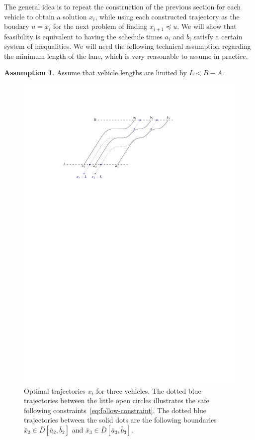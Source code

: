 \documentclass[a4paper]{report}
\theoremstyle{definition}
\newtheorem{assump}{Assumption}[chapter]
\theoremstyle{plain}
\begin{document}
%
The general idea is to repeat the construction of the previous section for each
vehicle to obtain a solution $x_{i}$, while using each constructed trajectory as
the boudary $u = x_{i}$ for the next problem of finding $x_{i+1} \preceq u$.
%
We will show that feasibility is equivalent to having the schedule times $a_{i}$
and $b_{i}$ satisfy a certain system of inequalities.
%
We will need the following technical assumption regarding the minimum length of
the lane, which is very reasonable to assume in practice.

\begin{assump}\label{assump:L-bound}
  Assume that vehicle lengths are limited by $L < B - A$.
\end{assump}

\begin{figure}
  \centering
  \includegraphics[scale=1.0]{figures/motion/solution}
  \caption{Optimal trajectories $x_{i}$ for three vehicles. The dotted blue
    trajectories between the little open circles illustrates the safe following
    constraints~\eqref{eq:follow-constraint}. The dotted blue trajectories between
    the solid dots are the following boundaries
    $\bar{x}_{2} \in \bar{D}[\bar{a}_{2}, \bar{b}_{2}]$ and
    $\bar{x}_{3} \in \bar{D}[\bar{a}_{3}, \bar{b}_{3}]$.}%
  \label{fig:solution}
\end{figure}
\end{document}
